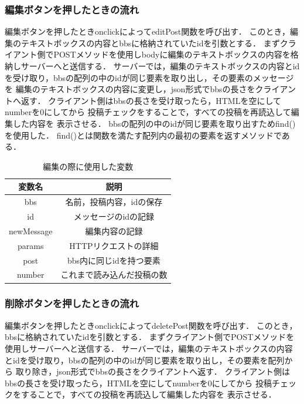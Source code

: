 \documentclass{jsarticle}
\begin{document}
\subsubsection*{編集ボタンを押したときの流れ}
編集ボタンを押したときonclickによってeditPost関数を呼び出す．
このとき，編集のテキストボックスの内容とbbsに格納されていたidを引数とする．
まずクライアント側でPOSTメソッドを使用しbodyに編集のテキストボックスの内容を格納しサーバーへと送信する．
サーバーでは，編集のテキストボックスの内容とidを受け取り，bbsの配列の中のidが同じ要素を取り出し，その要素のメッセージを
編集のテキストボックスの内容に変更し，json形式でbbsの長さをクライアントへ返す．
クライアント側はbbsの長さを受け取ったら，HTMLを空にしてnumberを0にしてから
投稿チェックをすることで，すべての投稿を再読込して編集した内容を
表示させる．
bbsの配列の中のidが同じ要素を取り出すためfind()を使用した．
find()とは関数を満たす配列内の最初の要素を返すメソッドである．

\begin{table}[ht]\caption{編集の際に使用した変数}
    \centering
    \begin{tabular}{|c|c|}
       \hline
       変数名 &  説明  \\ 
        \hline
        bbs  &  名前，投稿内容，idの保存\\ \hline
        id &  メッセージのidの記録  \\ \hline
        newMessage  & 編集内容の記録  \\ \hline
        params& HTTPリクエストの詳細 \\ \hline
        post &  bbs内に同じidを持つ要素 \\ \hline
        number   & これまで読み込んだ投稿の数  \\ \hline
    \end{tabular}
    \label{edit}
\end{table}


\subsubsection*{削除ボタンを押したときの流れ}
編集ボタンを押したときonclickによってdeletePost関数を呼び出す．
このとき，bbsに格納されていたidを引数とする．
まずクライアント側でPOSTメソッドを使用しサーバーへと送信する．
サーバーでは，編集のテキストボックスの内容とidを受け取り，bbsの配列の中のidが同じ要素を取り出し，その要素を配列から
取り除き，json形式でbbsの長さをクライアントへ返す．
クライアント側はbbsの長さを受け取ったら，HTMLを空にしてnumberを0にしてから
投稿チェックをすることで，すべての投稿を再読込して編集した内容を
表示させる．
\end{document}
